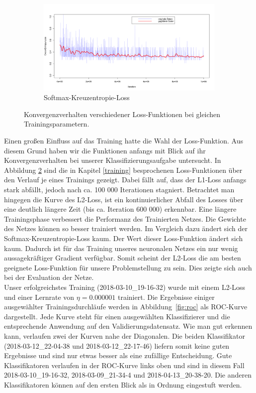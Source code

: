 \begin{figure}[htb!]
\begin{subfigure}[t]{0.49\textwidth}
	\end{subfigure}
	\hfill
	\begin{subfigure}[t]{0.49\textwidth}
		\includegraphics[width=\textwidth]{pics/losses/ce_loss.png}
		\caption{Softmax-Kreuzentropie-Loss}
		\label{fig:losses_ce}
	\end{subfigure}		
	\caption{Konvergenzverhalten verschiedener Loss-Funktionen bei gleichen Trainingsparametern.}
	\label{fig:losses}			
\end{figure}

Einen großen Einfluss auf das Training hatte die Wahl der Loss-Funktion. Aus diesem Grund haben wir die Funktionen anfangs mit Blick auf ihr Konvergenzverhalten bei unserer Klassifizierungsaufgabe untersucht. In Abbildung \ref{fig:losses} sind die in Kapitel \ref{training} besprochenen Loss-Funktionen über den Verlauf je eines Trainings gezeigt. Dabei fällt auf, dass der L1-Loss anfangs stark abfällt, jedoch nach ca. 100 000 Iterationen stagniert. Betrachtet man hingegen die Kurve des L2-Loss, ist ein kontinuierlicher Abfall des Losses über eine deutlich längere Zeit (bis ca. Iteration 600 000) erkennbar. Eine längere Trainingsphase verbessert die Performanz des Trainierten Netzes. Die Gewichte des Netzes können so besser trainiert werden. Im Vergleich dazu ändert sich der Softmax-Kreuzentropie-Loss kaum. Der Wert dieser Loss-Funktion ändert sich kaum. Dadurch ist für das Training unseres neuronalen Netzes ein nur wenig aussagekräftiger Gradient verfügbar. Somit scheint der L2-Loss die am besten geeignete Loss-Funktion für unsere Problemstellung zu sein. Dies zeigte sich auch bei der Evaluation der Netze.\\

Unser erfolgreichstes Training (2018-03-10\_19-16-32) wurde mit einem L2-Loss und einer Lernrate von $\eta= 0.000001$ trainiert. Die Ergebnisse einiger ausgewählter Trainingsdurchläufe werden in Abbildung~\ref{fig:roc} als ROC-Kurve dargestellt. Jede Kurve steht für einen ausgewählten Klassifizierer und die entsprechende Anwendung auf den Validierungsdatensatz. Wie man gut erkennen kann, verlaufen zwei der Kurven nahe der Diagonalen. Die beiden Klassifikator (2018-03-12\_22-04-38 und 2018-03-12\_22-17-46) liefern somit keine guten Ergebnisse und sind nur etwas besser als eine zufällige Entscheidung. Gute Klassifikatoren verlaufen in der ROC-Kurve links oben und sind in diesem Fall 2018-03-10\_19-16-32, 2018-03-09\_21-34-4 und 2018-04-13\_20-38-20. Die anderen Klassifikatoren können auf den ersten Blick als in Ordnung eingestuft werden.

